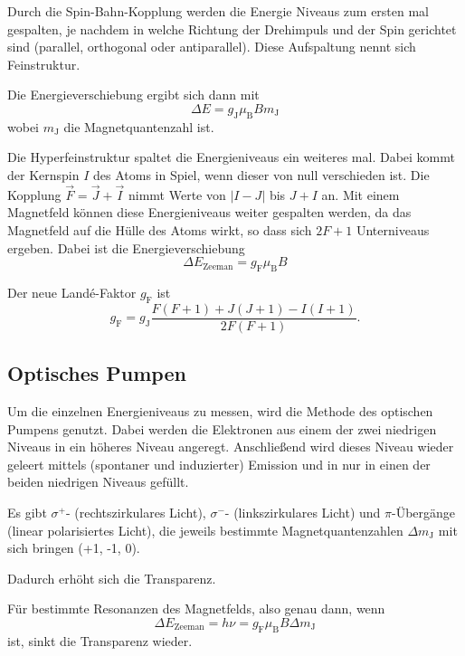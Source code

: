 Durch die Spin-Bahn-Kopplung werden die Energie Niveaus zum ersten mal gespalten, je nachdem in welche Richtung der Drehimpuls und der Spin gerichtet sind (parallel, orthogonal oder antiparallel).
Diese Aufspaltung nennt sich Feinstruktur. 

Die Energieverschiebung ergibt sich dann mit 
\begin{equation*}
    \Delta E = g_\text{J} \mu_\text{B} B m_\text{J}
\end{equation*}
wobei $m_\text{J}$ die Magnetquantenzahl ist.

Die Hyperfeinstruktur spaltet die Energieniveaus ein weiteres mal. 
Dabei kommt der Kernspin $I$ des Atoms in Spiel, wenn dieser von null verschieden ist.
Die Kopplung $\vec F = \vec J + \vec I$ nimmt Werte von $| I - J|$ bis $J+I$ an. 
Mit einem Magnetfeld können diese Energieniveaus weiter gespalten werden, da das Magnetfeld auf die Hülle des Atoms wirkt, so dass sich $2F+1$ Unterniveaus ergeben. 
Dabei ist die Energieverschiebung 
\begin{equation*}
    \Delta E_\text{Zeeman} = g_\text{F} \mu_\text{B} B
\end{equation*}

Der neue Landé-Faktor $g_\text{F}$ ist 
\begin{equation}
    g_\text{F} = g_\text{J} \frac{F(F+1) + J(J+1) - I(I+1)}{2F(F+1)}.
    \label{eq:I}
\end{equation}

\subsection{Optisches Pumpen}

Um die einzelnen Energieniveaus zu messen, wird die Methode des optischen Pumpens genutzt. Dabei werden die Elektronen aus einem der zwei niedrigen Niveaus in ein höheres Niveau angeregt. 
Anschließend wird dieses Niveau wieder geleert mittels (spontaner und induzierter) Emission und in nur in einen der beiden niedrigen Niveaus gefüllt. 

Es gibt $\sigma^+$- (rechtszirkulares Licht), $\sigma^-$- (linkszirkulares Licht) und $\pi$-Übergänge (linear polarisiertes Licht), die jeweils bestimmte Magnetquantenzahlen $\Delta m_\text{J}$ mit sich bringen (+1, -1, 0).


Dadurch erhöht sich die Transparenz. 

Für bestimmte Resonanzen des Magnetfelds, also genau dann, wenn 
\begin{equation}
    \Delta E_\text{Zeeman} = h \nu = g_\text{F} \mu_\text{B} B \Delta m_\text{J}
    \label{eq:Zeeman}
\end{equation}
ist, sinkt die Transparenz wieder.

